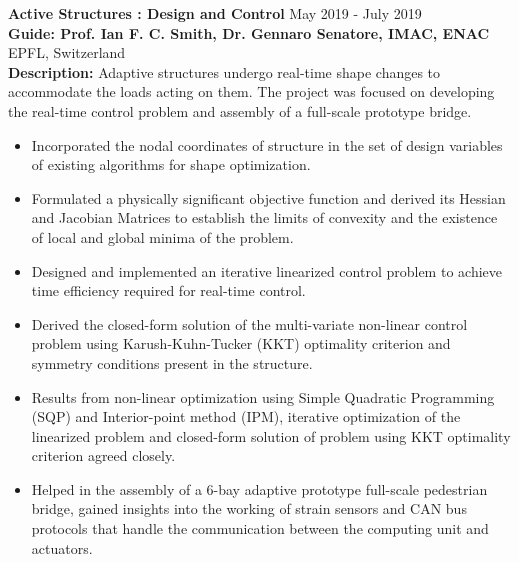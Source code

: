 
\textbf{Active Structures : Design and Control} \hfill{May 2019 - July 2019}\\
\textbf{Guide: Prof. Ian F. C. Smith, Dr. Gennaro Senatore, IMAC, ENAC} \hfill{EPFL, Switzerland} \\
\textbf{Description:} {Adaptive structures undergo real-time shape changes to accommodate the loads acting on them. The project was focused on developing the real-time control problem and assembly of a full-scale prototype bridge.}
\begin{itemize}
    \setlength\itemsep{0.7mm}
    \item Incorporated the nodal coordinates of structure in the set of design variables of existing algorithms for shape optimization.
    \item Formulated a physically significant objective function and derived its Hessian and Jacobian Matrices to establish the limits of convexity and the existence of local and global minima of the problem.
    \item Designed and implemented an iterative linearized control problem to achieve time efficiency required for real-time control.
    \item Derived the closed-form solution of the multi-variate non-linear control problem using Karush-Kuhn-Tucker (KKT) optimality criterion and symmetry conditions present in the structure.
    \item Results from non-linear optimization using Simple Quadratic Programming (SQP) and Interior-point method (IPM), iterative optimization of the linearized problem and closed-form solution of problem using KKT optimality criterion agreed closely.
    \item Helped in the assembly of a 6-bay adaptive prototype full-scale pedestrian bridge, gained insights into the working of strain sensors and CAN bus protocols that handle the communication between the computing unit and actuators.
\end{itemize}